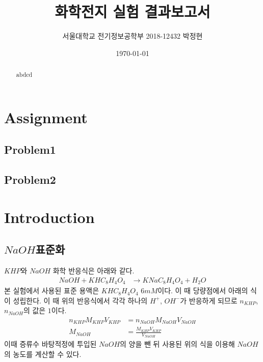 \documentclass[%
 reprint,
 amsmath,amssymb,
 aps,
]{revtex4-2}
\begin{document}
\title{화학전지 실험 결과보고서}

\author{서울대학교 전기정보공학부 2018-12432 박정현}
\date{\today}%

\begin{abstract}
abdcd
\end{abstract}

\maketitle


\section{\label{sec:level1}Assignment}
\subsection{\label{sec:level2}Problem1}
\subsection{\label{sec:level2}Problem2}


\section{\label{sec:level1}Introduction}
\subsection{\label{sec:level2}$NaOH$표준화}
$KHP$와 $NaOH$ 화학 반응식은 아래와 같다.
\begin{align}
	NaOH + KHC_{8}H_{4}O_{4} &\rightarrow KNaC_{8}H_{4}O_{4} + H_{2}O
\end{align}
본 실험에서 사용된 표준 용액은 $KHC_{8}H_{4}O_{4}$ $6mM$이다. 이 때 당량점에서 아래의 식이 성립한다. 이 때 위의 반응식에서 각각 하나의 $H^{+}$, $OH^{-}$가 반응하게 되므로 $n_{KHP}$, $n_{NaOH}$의 값은 $1$이다.
\begin{align}
	n_{KHP}M_{KHP}V_{KHP} &= n_{NaOH}M_{NaOH}V_{NaOH}\\
	M_{NaOH} &= \frac{M_{KHP}V_{KHP}}{V_{NaOH}}
\end{align}
이때 증류수 바탕적정에 투입된 $NaOH$의 양을 뺀 뒤 사용된 위의 식을 이용해 $NaOH$의 농도를 계산할 수 있다.
\end{document}
